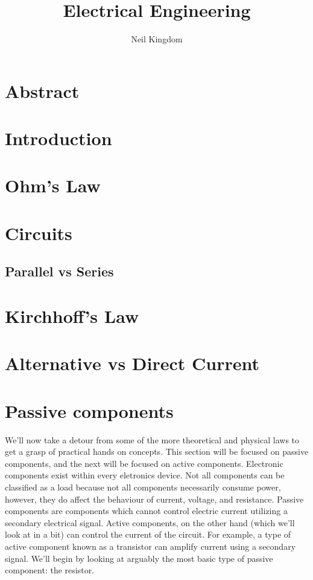 \documentclass{article}
\title{Electrical Engineering}
\author{Neil Kingdom}
\begin{document}
\begin{titlingpage}

\maketitle

\end{titlingpage}

\newpage

\tableofcontents

\newpage

\section{Abstract}

\section{Introduction}

\section{Ohm's Law}

\section{Circuits}

\subsection{Parallel vs Series}

\section{Kirchhoff's Law}

\section{Alternative vs Direct Current}

\section{Passive components}

We'll now take a detour from some of the more theoretical and physical laws to get a grasp of practical hands
on concepts. This section will be focused on passive components, and the next will be focused on active
components. Electronic components exist within every eletronics device. Not all components can be classified as
a load because not all components necessarily consume power, however, they do affect the behaviour of current,
voltage, and resistance. Passive components are components which cannot control electric current utilizing a
secondary electrical signal. Active components, on the other hand (which we'll look at in a bit) can control
the current of the circuit. For example, a type of active component known as a transistor can amplify current
using a secondary signal. We'll begin by looking at arguably the most basic type of passive component: the
resistor.
\end{document}
